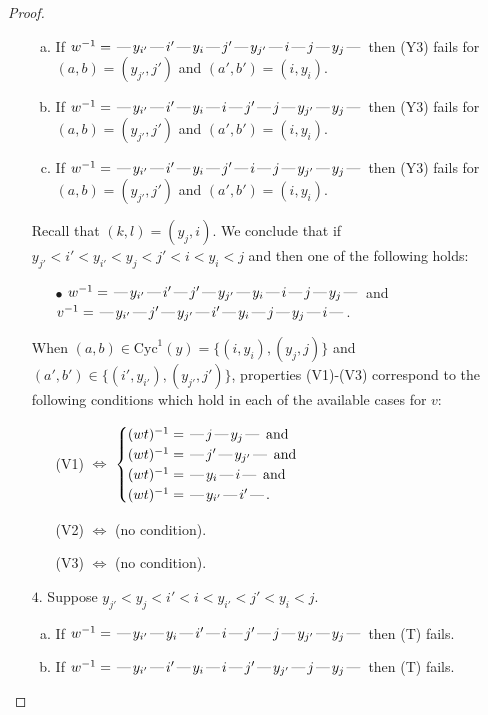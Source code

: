 \documentclass[10pt]{article}
\theoremstyle{definition}
\theoremstyle{definition}
\def\dash{\text{\hspace{0.5mm}---\hspace{0.5mm}}}
\def\Cyc{\mathrm{Cyc}}
\begin{document}
\begin{proof}
\begin{enumerate}
\begin{enumerate}[(a)]
\item If $w^{-1} = \dash y_{i'}\dash i'\dash y_i\dash j'\dash y_{j'}\dash i\dash j\dash y_j\dash $ then (Y3) fails for $(a,b)=(y_{j'},j')$ and $(a',b')=(i,y_i)$.
\item If $w^{-1} = \dash y_{i'}\dash i'\dash y_i\dash i\dash j'\dash j\dash y_{j'}\dash y_j\dash $ then (Y3) fails for $(a,b)=(y_{j'},j')$ and $(a',b')=(i,y_i)$.
\item If $w^{-1} = \dash y_{i'}\dash i'\dash y_i\dash j'\dash i\dash j\dash y_{j'}\dash y_j\dash $ then (Y3) fails for $(a,b)=(y_{j'},j')$ and $(a',b')=(i,y_i)$.
\end{enumerate}
Recall that $(k,l) = (y_j,i)$.
We conclude that if $y_{j'} < i' < y_{i'} < y_j < j' < i < y_i < j$ and then one of the following holds:
\begin{enumerate}
\item[$\bullet$] $w^{-1} = \dash y_{i'}\dash i'\dash j'\dash y_{j'}\dash y_i\dash i\dash j\dash y_j\dash $ and $v^{-1} = \dash y_{i'}\dash j'\dash y_{j'}\dash i'\dash y_i\dash j\dash y_j\dash i\dash $.
\end{enumerate}
When $(a,b)\in\Cyc^1(y)=\{(i,y_i),(y_j,j)\}$ and $(a',b')\in\{(i',y_{i'}),(y_{j'},j')\}$,
properties (V1)-(V3) correspond to the following conditions which hold in
each of the available cases for $v$:
\begin{enumerate}
\item[](V1) $\Leftrightarrow$ $\begin{cases}\text{$(wt)^{-1} = \dash j \dash y_j \dash$}\text{ and }\\
\text{$(wt)^{-1} = \dash j' \dash y_{j'} \dash$}\text{ and }\\
\text{$(wt)^{-1} = \dash y_i \dash i \dash$}\text{ and }\\
\text{$(wt)^{-1} = \dash y_{i'} \dash i' \dash$}.\end{cases}$
\item[](V2) $\Leftrightarrow$ (no condition).
\item[](V3) $\Leftrightarrow$ (no condition).
\end{enumerate}
\item[$4$.] Suppose $y_{j'} < y_j < i' < i < y_{i'} < j' < y_i < j$.
\begin{enumerate}[(a)]
\item If $w^{-1} = \dash y_{i'}\dash y_i\dash i'\dash i\dash j'\dash j\dash y_{j'}\dash y_j\dash $ then (T) fails.
\item If $w^{-1} = \dash y_{i'}\dash i'\dash y_i\dash i\dash j'\dash y_{j'}\dash j\dash y_j\dash $ then (T) fails.

\end{enumerate}
\end{enumerate}
\end{proof}
\end{document}
